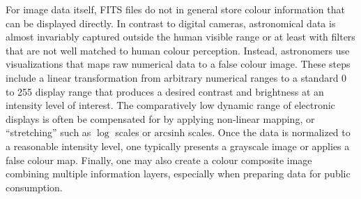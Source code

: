 \documentclass{juliacon}
\begin{document}
For image data itself, FITS files do not in general store colour information that can be displayed directly. In contrast to digital cameras, astronomical data is almost invariably captured outside the human visible range or at least with filters that are not well matched to human colour perception.
Instead, astronomers use visualizations that maps raw numerical data to a false colour image.
These steps include a linear transformation from arbitrary numerical ranges to a standard 0 to 255 display range that produces a desired contrast and brightness at an intensity level of interest.
The comparatively low dynamic range of electronic displays is often be compensated for by applying non-linear mapping, or ``stretching'' such as $\log$ scales or $\mathrm{arcsinh}$ scales.
Once the data is normalized to a reasonable intensity level, one typically presents a grayscale image or applies a false colour map.
Finally, one may also create a colour composite image combining multiple information layers, especially when preparing data for public consumption.


                                                                            
\end{document}
